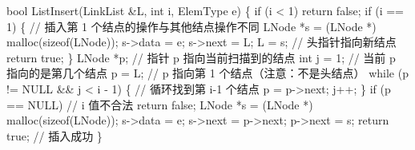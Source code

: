 \documentclass[10.5pt,a4paper,oneside]{article}
\newenvironment{Shaded}{}{}
\newcommand{\CommentTok}[1]{\textcolor[rgb]{0.18,0.55,0.23}{#1}}
\newcommand{\ControlFlowTok}[1]{\textcolor[rgb]{0.12,0.31,0.71}{#1}}
\newcommand{\DataTypeTok}[1]{\textcolor[rgb]{0.12,0.31,0.71}{#1}}
\newcommand{\DecValTok}[1]{\textcolor[rgb]{0.77,0.35,0.07}{#1}}
\newcommand{\KeywordTok}[1]{\textcolor[rgb]{0.12,0.31,0.71}{#1}}
\newcommand{\NormalTok}[1]{#1}
\newcommand{\OperatorTok}[1]{\textcolor[rgb]{0.20,0.20,0.20}{#1}}
\begin{document}
\begin{Shaded}
\begin{Highlighting}[]
\DataTypeTok{bool}\NormalTok{ ListInsert}\OperatorTok{(}\NormalTok{LinkList }\OperatorTok{\&}\NormalTok{L}\OperatorTok{,} \DataTypeTok{int}\NormalTok{ i}\OperatorTok{,}\NormalTok{ ElemType e}\OperatorTok{)} \OperatorTok{\{}
    \ControlFlowTok{if} \OperatorTok{(}\NormalTok{i }\OperatorTok{\textless{}} \DecValTok{1}\OperatorTok{)}
        \ControlFlowTok{return} \KeywordTok{false}\OperatorTok{;}
    \ControlFlowTok{if} \OperatorTok{(}\NormalTok{i }\OperatorTok{==} \DecValTok{1}\OperatorTok{)} \OperatorTok{\{}    \CommentTok{// 插入第 1 个结点的操作与其他结点操作不同}
\NormalTok{        LNode }\OperatorTok{*}\NormalTok{s }\OperatorTok{=} \OperatorTok{(}\NormalTok{LNode }\OperatorTok{*)}\NormalTok{ malloc}\OperatorTok{(}\KeywordTok{sizeof}\OperatorTok{(}\NormalTok{LNode}\OperatorTok{));}
\NormalTok{        s}\OperatorTok{{-}\textgreater{}}\NormalTok{data }\OperatorTok{=}\NormalTok{ e}\OperatorTok{;}
\NormalTok{        s}\OperatorTok{{-}\textgreater{}}\NormalTok{next }\OperatorTok{=}\NormalTok{ L}\OperatorTok{;}
\NormalTok{        L }\OperatorTok{=}\NormalTok{ s}\OperatorTok{;}       \CommentTok{// 头指针指向新结点}
        \ControlFlowTok{return} \KeywordTok{true}\OperatorTok{;}
    \OperatorTok{\}}
\NormalTok{    LNode }\OperatorTok{*}\NormalTok{p}\OperatorTok{;}        \CommentTok{// 指针 p 指向当前扫描到的结点}
    \DataTypeTok{int}\NormalTok{ j }\OperatorTok{=} \DecValTok{1}\OperatorTok{;}       \CommentTok{// 当前 p 指向的是第几个结点}
\NormalTok{    p }\OperatorTok{=}\NormalTok{ L}\OperatorTok{;}           \CommentTok{// p 指向第 1 个结点（注意：不是头结点）}
    \ControlFlowTok{while} \OperatorTok{(}\NormalTok{p }\OperatorTok{!=}\NormalTok{ NULL }\OperatorTok{\&\&}\NormalTok{ j }\OperatorTok{\textless{}}\NormalTok{ i }\OperatorTok{{-}} \DecValTok{1}\OperatorTok{)} \OperatorTok{\{}   \CommentTok{// 循环找到第 i{-}1 个结点}
\NormalTok{        p }\OperatorTok{=}\NormalTok{ p}\OperatorTok{{-}\textgreater{}}\NormalTok{next}\OperatorTok{;}
\NormalTok{        j}\OperatorTok{++;}
    \OperatorTok{\}}
    \ControlFlowTok{if} \OperatorTok{(}\NormalTok{p }\OperatorTok{==}\NormalTok{ NULL}\OperatorTok{)}   \CommentTok{// i 值不合法}
        \ControlFlowTok{return} \KeywordTok{false}\OperatorTok{;}
\NormalTok{    LNode }\OperatorTok{*}\NormalTok{s }\OperatorTok{=} \OperatorTok{(}\NormalTok{LNode }\OperatorTok{*)}\NormalTok{ malloc}\OperatorTok{(}\KeywordTok{sizeof}\OperatorTok{(}\NormalTok{LNode}\OperatorTok{));}
\NormalTok{    s}\OperatorTok{{-}\textgreater{}}\NormalTok{data }\OperatorTok{=}\NormalTok{ e}\OperatorTok{;}
\NormalTok{    s}\OperatorTok{{-}\textgreater{}}\NormalTok{next }\OperatorTok{=}\NormalTok{ p}\OperatorTok{{-}\textgreater{}}\NormalTok{next}\OperatorTok{;}
\NormalTok{    p}\OperatorTok{{-}\textgreater{}}\NormalTok{next }\OperatorTok{=}\NormalTok{ s}\OperatorTok{;}
    \ControlFlowTok{return} \KeywordTok{true}\OperatorTok{;}     \CommentTok{// 插入成功}
\OperatorTok{\}}
\end{Highlighting}
\end{Shaded}
\end{document}
